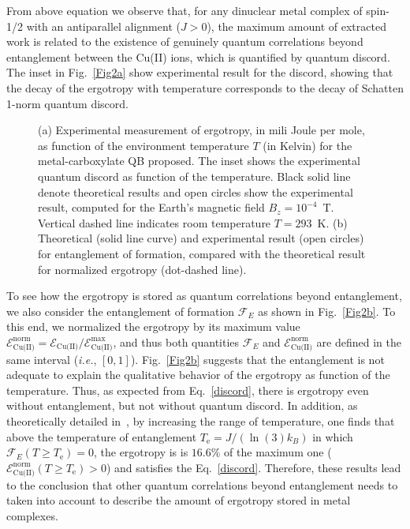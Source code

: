 \documentclass[aps,prl,epsfigure,twocolumn,superscriptaddress]{revtex4-1}
\newcommand{\Ecal}{\mathcal{E}}
\newcommand{\Fcal}{\mathcal{F}}
\newcommand{\1}{\mathbbm{1}}
\begin{document}
From above equation we observe that, for any dinuclear metal complex of spin-1/2 with an antiparallel alignment ($J\!>\!0$), the maximum amount of extracted work is related to the existence of genuinely quantum correlations beyond entanglement between the Cu(II) ions, which is quantified by quantum discord. The inset in Fig.~\ref{Fig2a} show experimental result for the discord, showing that the decay of the ergotropy with temperature corresponds to the decay of Schatten 1-norm quantum discord.

\begin{figure}[t!]
	\centering
	\caption{{\color{blue}(a)} Experimental measurement of ergotropy, in mili Joule per mole, as function of the environment temperature $T$ (in Kelvin) for the metal-carboxylate QB proposed. The inset shows the experimental quantum discord  as function of the temperature. Black solid line denote theoretical results and open circles show the experimental result, computed for the Earth's magnetic field $B_z\!=\!10^{-4}$~T. Vertical dashed line indicates room temperature $T\!=\!293$~K. {\color{blue}(b)} Theoretical (solid line curve) and experimental result (open circles) for entanglement of formation, compared with the theoretical result for normalized ergotropy (dot-dashed line).}
	\label{QuantitiesFig}
\end{figure}

To see how the ergotropy is stored as quantum correlations beyond entanglement, we also consider the entanglement of formation $\Fcal_{E}$ as shown in Fig.~\ref{Fig2b}. To this end, we normalized the ergotropy by its maximum value $\Ecal^{\text{norm}}_{\text{Cu(II)}}\!=\!\Ecal_{\text{Cu(II)}}/\Ecal^{\text{max}}_{\text{Cu(II)}}$, and thus both quantities $\Fcal_{E}$ and $\Ecal^{\text{norm}}_{\text{Cu(II)}}$ are defined in the same interval (\textit{i.e.}, $[0,1]$). Fig.~\ref{Fig2b} suggests that the entanglement is not adequate to explain the qualitative behavior of the ergotropy as function of the temperature. Thus, as expected from Eq.~\eqref{discord}, there is ergotropy even without entanglement, but not without quantum discord. In addition, as theoretically detailed in~\cite{SupInf}, by increasing the range of temperature, one finds that above the temperature of entanglement $T_{\text{e}}=J /(\ln (3)k_{B})$ in which $\Fcal_{E}(T\!\geq\! T_{\text{e}})\!=\!0$, the ergotropy is is $16.6\%$ of the maximum one ($\Ecal^{\text{norm}}_{\text{Cu(II)}}(T\!\geq\!T_{\text{e}})\!>\!0$) and satisfies the Eq.~\eqref{discord}.
Therefore, these results lead to the conclusion that other quantum correlations beyond entanglement needs to taken into account to describe the amount of ergotropy stored in metal complexes. 
\end{document}
